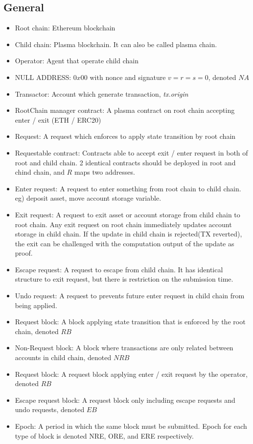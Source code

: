 \documentclass[letterpaper, 11pt]{article}
\begin{document}
\subsection{General}
\begin{CJK}{UTF8}{mj}
\begin{itemize}
    \item Root chain: Ethereum blockchain
    \item Child chain: Plasma blockchain. It can also be called plasma chain.
    \item Operator: Agent that operate child chain
    \item NULL ADDRESS: $0x00$ with nonce and signature $v = r = s = 0$, denoted $NA$
    \item Transactor: Account which generate transaction, \emph{tx.origin}
    \item RootChain manager contract: A plasma contract on root chain accepting enter / exit (ETH / ERC20)
    \item Request: A request which enforces to apply state transition by root chain
    \item Requestable contract: Contracts able to accept exit / enter request in both of root and child chain. 2 identical contracts should be deployed in root and chind chain, and $R$ maps two addresses.
    \item Enter request: A request to enter something from root chain to child chain. eg) deposit asset, move account storage variable.
    \item Exit request: A request to exit asset or account storage from child chain to root chain. Any exit request on root chain immediately updates account storage in child chain. If the update in child chain is rejected(TX  reverted), the exit can be challenged with the computation output of the update as proof.
    \item Escape request: A request to escape from child chain. It has identical structure to exit request, but there is restriction on the submission time.
    \item Undo request: A request to prevents future enter request in child chain from being applied.
    \item Request block: A block applying state transition that is enforced by the root chain, denoted $RB$
    \item Non-Request block: A block where transactions are only related between accounts in child chain, denoted $NRB$
    \item Request block: A request block applying enter / exit request by the operator, denoted $RB$
    \item Escape request block: A request block only including escape requests and undo requests, denoted $EB$
    \item Epoch: A period in which the same block must be submitted. Epoch for each type of block is denoted NRE, ORE, and ERE respectively.
\end{itemize}
\end{CJK}
\end{document}
